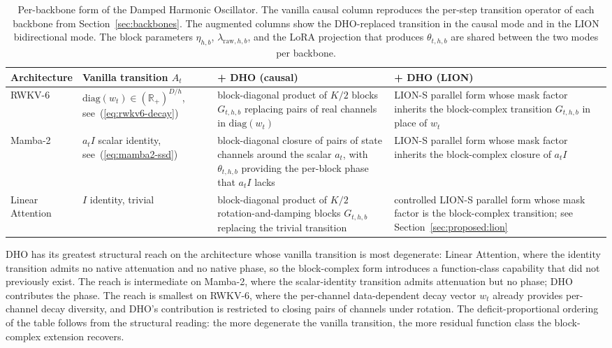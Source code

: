 \begin{table}[t]
\centering
\small
\caption[Per-backbone form of the Damped Harmonic
Oscillator]{Per-backbone form of the Damped Harmonic
Oscillator. The vanilla causal column reproduces the per-step
transition operator of each backbone from
Section~\ref{sec:backbones}. The augmented columns show the
DHO-replaced transition in the causal mode and in the LION
bidirectional mode. The block parameters $\eta_{h, b}$,
$\lambda_{\mathrm{raw}, h, b}$, and the LoRA projection that
produces $\theta_{t, h, b}$ are shared between the two modes per
backbone.}
\label{tab:dho-deployment}
\setlength{\tabcolsep}{4pt}
\renewcommand{\arraystretch}{1.25}
\begin{tabularx}{\linewidth}{@{}p{2.4cm} X X X@{}}
\toprule
\textbf{Architecture} & \textbf{Vanilla transition $A_{t}$} & \textbf{+ DHO (causal)} & \textbf{+ DHO (LION)} \\
\midrule
RWKV-6 &
$\mathrm{diag}(w_{t}) \in (\mathbb{R}_{+})^{D/h}$, see~(\ref{eq:rwkv6-decay}) &
block-diagonal product of $K/2$ blocks $G_{t, h, b}$ replacing pairs of real channels in $\mathrm{diag}(w_{t})$ &
LION-S parallel form whose mask factor inherits the block-complex transition $G_{t, h, b}$ in place of $w_{t}$ \\
\addlinespace
Mamba-2 &
$a_{t} I$ scalar identity, see~(\ref{eq:mamba2-ssd}) &
block-diagonal closure of pairs of state channels around the scalar $a_{t}$, with $\theta_{t, h, b}$ providing the per-block phase that $a_{t} I$ lacks &
LION-S parallel form whose mask factor inherits the block-complex closure of $a_{t} I$ \\
\addlinespace
\shortstack[l]{Linear\\Attention} &
$I$ identity, trivial &
block-diagonal product of $K/2$ rotation-and-damping blocks $G_{t, h, b}$ replacing the trivial transition &
controlled LION-S parallel form whose mask factor is the block-complex transition; see Section~\ref{sec:proposed:lion} \\
\bottomrule
\end{tabularx}
\end{table}

DHO has its greatest structural reach on the architecture whose
vanilla transition is most degenerate: Linear Attention, where the
identity transition admits no native attenuation and no native
phase, so the block-complex form introduces a function-class
capability that did not previously exist. The reach is intermediate
on Mamba-2, where the scalar-identity transition admits attenuation
but no phase; DHO contributes the phase. The reach is smallest on
RWKV-6, where the per-channel data-dependent decay vector $w_{t}$
already provides per-channel decay diversity, and DHO's contribution
is restricted to closing pairs of channels under rotation. The
deficit-proportional ordering of the table follows from the
structural reading: the more degenerate the vanilla transition, the
more residual function class the block-complex extension recovers.


